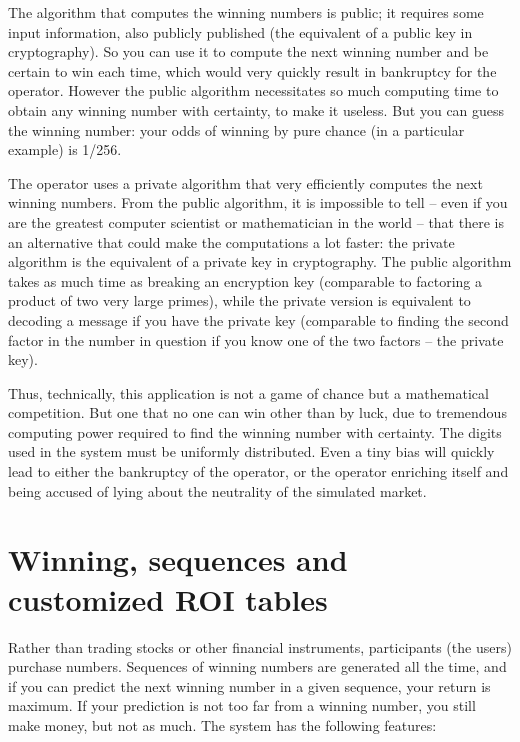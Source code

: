 \documentclass[oneside,10pt]{book}
\begin{document}
The algorithm that computes the winning numbers is public; it requires some input information, also publicly published (the equivalent of a public key in cryptography). So you can use it to compute the next winning number and be certain to win each time, which would very quickly result in bankruptcy for the operator. However the public algorithm necessitates so much computing time to obtain any winning number with certainty, to make it useless. But you can guess the winning number: your odds of winning by pure chance (in a particular example) is 1/256.

The operator uses a private algorithm
that very efficiently computes the next winning numbers. From the public algorithm, it is impossible to tell -- even if you are the greatest computer scientist or mathematician in the world -- that there is an alternative that could make the computations a lot faster: the private algorithm is the equivalent of a private key in cryptography. The public algorithm takes as much time as breaking an encryption key (comparable to factoring a product of two very large primes), while the private version is equivalent to decoding a message if you have the private key (comparable to finding the second factor in  the number in question if you know one of the two factors -- the private key).

Thus, technically, this application is not a game of chance but a mathematical competition. But one that no one can win
other than by luck, due to tremendous computing power required to find the winning number with certainty. The
digits used in the system must be uniformly distributed. Even a tiny bias will quickly lead to either the bankruptcy of the operator, or the operator enriching itself and being accused of lying about the neutrality of the simulated market.



\section{Winning, sequences and customized ROI tables}

Rather than trading stocks or other financial instruments, participants (the users) purchase numbers. Sequences of winning numbers are generated all the time, and if you can predict the next winning number in a given sequence, your return is maximum. If your prediction is not too far from a winning number, you still make money, but not as much. The system has the following features:
\vspace{1ex}
\end{document}
